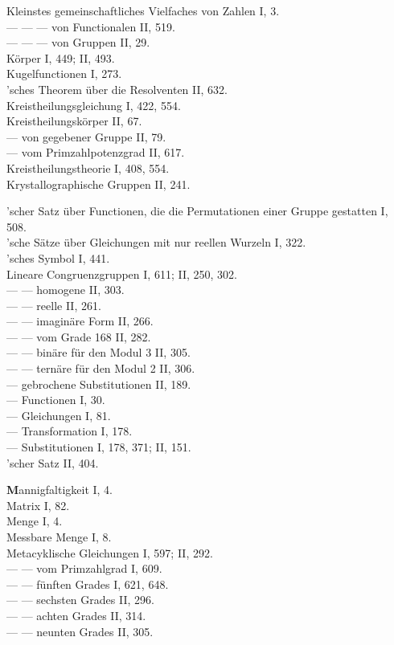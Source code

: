 
\noindent
Kleinstes gemeinschaftliches Vielfaches von Zahlen I, 3.\\
--- --- --- von Functionalen II, 519.\\
--- --- --- von Gruppen II, 29.\\
Körper I, 449; II, 493.\\
Kugelfunctionen I, 273.\\
'sches Theorem über die Resolventen II, 632.\\
Kreistheilungsgleichung I, 422, 554.\\
Kreistheilungskörper II, 67.\\
--- von gegebener Gruppe II, 79.\\
--- vom Primzahlpotenzgrad II, 617.\\
Kreistheilungstheorie I, 408, 554.\\
Krystallographische Gruppen II, 241.

\medskip
\noindent
{}'scher Satz über Functionen, die die Permutationen einer Gruppe gestatten I, 508.\\
'sche Sätze über Gleichungen mit nur reellen Wurzeln I, 322.\\
'sches Symbol I, 441.\\
Lineare Congruenzgruppen I, 611; II, 250, 302.\\
--- --- homogene II, 303.\\
--- --- reelle II, 261.\\
--- --- imaginäre Form II, 266.\\
--- --- vom Grade 168 II, 282.\\
--- --- binäre für den Modul 3 II, 305.\\
--- --- ternäre für den Modul 2 II, 306.\\
--- gebrochene Substitutionen II, 189.\\
--- Functionen I, 30.\\
--- Gleichungen I, 81.\\
--- Transformation I, 178.\\
--- Substitutionen I, 178, 371; II, 151.\\
'scher Satz II, 404.

\medskip
\noindent
\textbf{M}annigfaltigkeit I, 4.\\
Matrix I, 82.\\
Menge I, 4.\\
Messbare Menge I, 8.\\
Metacyklische Gleichungen I, 597; II, 292.\\
--- --- vom Primzahlgrad I, 609.\\
--- --- fünften Grades I, 621, 648.\\
--- --- sechsten Grades II, 296.\\
--- --- achten Grades II, 314.\\
--- --- neunten Grades II, 305.

